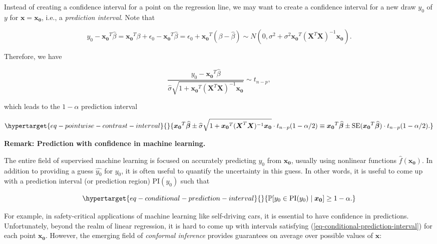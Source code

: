 \documentclass[
  11pt,
  letterpaper,
  oneside]{book}
\theoremstyle{definition}
\theoremstyle{plain}
\theoremstyle{plain}
\theoremstyle{plain}
\theoremstyle{remark}
\begin{document}
Instead of creating a confidence interval for a point on the regression
line, we may want to create a confidence interval for a new draw \(y_0\)
of \(y\) for \(\boldsymbol{x} = \boldsymbol{x_0}\), i.e., a
\emph{prediction interval}. Note that

\[
y_0 - \boldsymbol{x_0}^T \widehat{\beta} = \boldsymbol{x_0}^T \beta + \epsilon_0 - \boldsymbol{x_0}^T \widehat{\beta} = \epsilon_0 + \boldsymbol{x_0}^T (\beta-\widehat{\beta}) \sim N(0, \sigma^2 + \sigma^2 \boldsymbol{x_0}^T (\boldsymbol{X}^T \boldsymbol{X})^{-1} \boldsymbol{x_0}).
\]

Therefore, we have

\[
\frac{y_0 - \boldsymbol{x_0}^T \widehat{\beta}}{\widehat{\sigma}\sqrt{1 + \boldsymbol{x_0}^T (\boldsymbol{X}^T \boldsymbol{X})^{-1} \boldsymbol{x_0}}} \sim t_{n-p},
\]

which leads to the \(1-\alpha\) prediction interval

\begin{equation}\protect\hypertarget{eq-pointwise-contrast-interval}{}{
\boldsymbol{x_0}^T \boldsymbol{\widehat{\beta}} \pm \widehat{\sigma} \sqrt{1+\boldsymbol{x_0}^T (\boldsymbol{X}^T \boldsymbol{X})^{-1} \boldsymbol{x_0}} \cdot t_{n-p}(1-\alpha/2) \equiv \boldsymbol{x_0}^T \boldsymbol{\widehat{\beta}} \pm \text{SE}(\boldsymbol{x_0}^T \boldsymbol{\widehat{\beta}}) \cdot t_{n-p}(1-\alpha/2).
}\label{eq-pointwise-contrast-interval}\end{equation}

\textbf{Remark: Prediction with confidence in machine learning.}

The entire field of supervised machine learning is focused on accurately
predicting \(y_0\) from \(\boldsymbol{x_0}\), usually using nonlinear
functions \(\widehat{f}(\boldsymbol{x_0})\). In addition to providing a
guess \(\widehat{y_0}\) for \(y_0\), it is often useful to quantify the
uncertainty in this guess. In other words, it is useful to come up with
a prediction interval (or prediction region) \(\text{PI}(y_0)\) such
that

\begin{equation}\protect\hypertarget{eq-conditional-prediction-interval}{}{
\mathbb{P}[y_0 \in \text{PI}(y_0) \mid \boldsymbol{x_0}] \geq 1-\alpha.
}\label{eq-conditional-prediction-interval}\end{equation}

For example, in safety-critical applications of machine learning like
self-driving cars, it is essential to have confidence in predictions.
Unfortunately, beyond the realm of linear regression, it is hard to come
up with intervals satisfying (\ref{eq-conditional-prediction-interval})
for each point \(\boldsymbol{x_0}\). However, the emerging field of
\emph{conformal inference} provides guarantees on average over possible
values of \(\boldsymbol{x}\):
\end{document}
